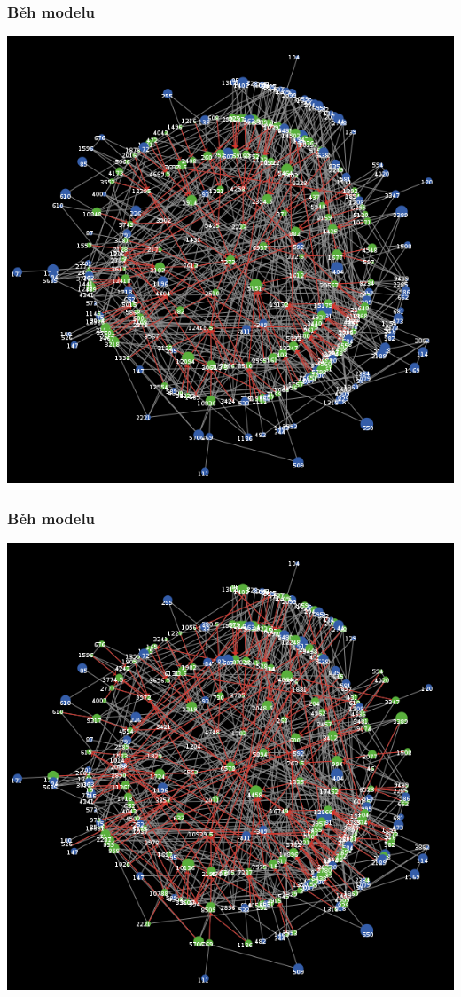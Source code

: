 \documentclass[xcolor=dvipsnames]{beamer}
\begin{document}
    \begin{frame}
    \frametitle{Běh modelu}
    \includegraphics[width=0.6\paperwidth]{4.png}
  \end{frame}
  \begin{frame}
    \frametitle{Běh modelu}
    \includegraphics[width=0.6\paperwidth]{5.png}
  \end{frame}
\end{document}
